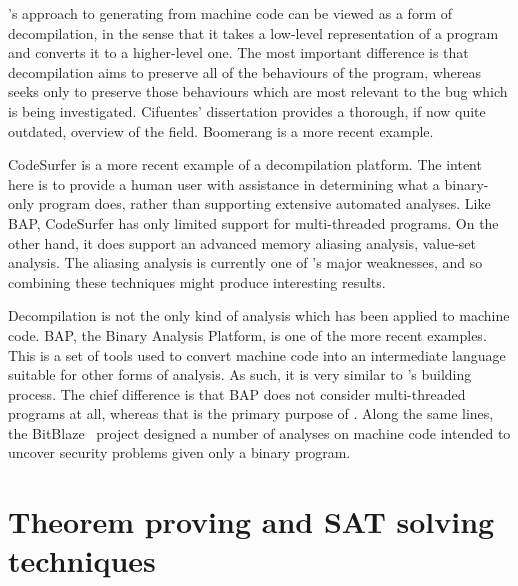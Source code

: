 {\Technique}'s approach to generating {\StateMachines} from machine
code can be viewed as a form of decompilation, in the sense that it
takes a low-level representation of a program and converts it to a
higher-level one.  The most important difference is that decompilation
aims to preserve all of the behaviours of the program, whereas
{\technique} seeks only to preserve those behaviours which are most
relevant to the bug which is being investigated.  Cifuentes'
dissertation\cite{Cifuentes1994} provides a thorough, if now quite
outdated, overview of the field.  Boomerang\cite{Emmerik2004} is a
more recent example.

CodeSurfer\cite{Balakrishnan2005a,Balakrishnan2008} is a more recent
example of a decompilation platform.  The intent here is to provide a
human user with assistance in determining what a binary-only program
does, rather than supporting extensive automated analyses.  Like BAP,
CodeSurfer has only limited support for multi-threaded programs.  On
the other hand, it does support an advanced memory aliasing analysis,
value-set analysis\cite{Balakrishnan2004}.  The aliasing analysis is
currently one of {\technique}'s major weaknesses, and so combining
these techniques might produce interesting results.   

Decompilation is not the only kind of analysis which has been applied
to machine code.  BAP, the Binary Analysis Platform\cite{Brumley2011},
is one of the more recent examples.  This is a set of tools used to
convert machine code into an intermediate language suitable for other
forms of analysis.  As such, it is very similar to {\technique}'s
{\StateMachine} building process.  The chief difference is that BAP
does not consider multi-threaded programs at all, whereas that is the
primary purpose of {\StateMachine}.  Along the same lines, the
BitBlaze~\cite{Song2008} project designed a number of analyses on
machine code intended to uncover security problems given only a binary
program.

\section{Theorem proving and SAT solving techniques}

